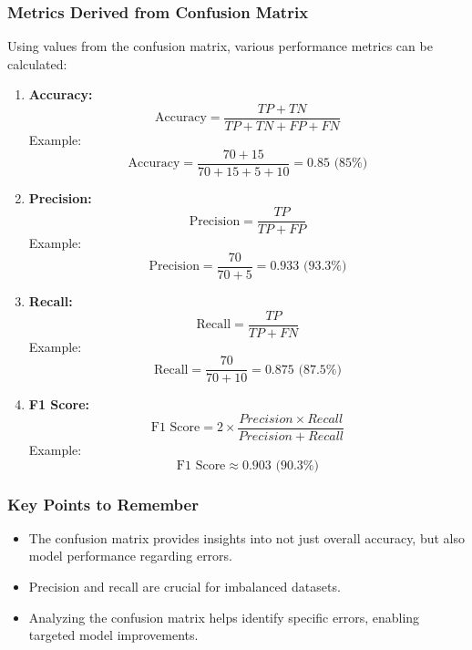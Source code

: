 \documentclass[aspectratio=169]{beamer}
\begin{document}
\begin{frame}[fragile]
  \frametitle{Metrics Derived from Confusion Matrix}
  Using values from the confusion matrix, various performance metrics can be calculated:

  \begin{enumerate}
    \item \textbf{Accuracy:}
      \begin{equation}
      \text{Accuracy} = \frac{TP + TN}{TP + TN + FP + FN}
      \end{equation}
      Example: 
      \begin{equation}
      \text{Accuracy} = \frac{70 + 15}{70 + 15 + 5 + 10} = 0.85 \text{ (85\%)}
      \end{equation}
    
    \item \textbf{Precision:} 
      \begin{equation}
      \text{Precision} = \frac{TP}{TP + FP}
      \end{equation}
      Example: 
      \begin{equation}
      \text{Precision} = \frac{70}{70 + 5} = 0.933 \text{ (93.3\%)}
      \end{equation}
    
    \item \textbf{Recall:} 
      \begin{equation}
      \text{Recall} = \frac{TP}{TP + FN}
      \end{equation}
      Example:
      \begin{equation}
      \text{Recall} = \frac{70}{70 + 10} = 0.875 \text{ (87.5\%)}
      \end{equation}
    
    \item \textbf{F1 Score:}
      \begin{equation}
      \text{F1 Score} = 2 \times \frac{Precision \times Recall}{Precision + Recall}
      \end{equation}
      Example:
      \begin{equation}
      \text{F1 Score} \approx 0.903 \text{ (90.3\%)}
      \end{equation}
  \end{enumerate}
\end{frame}

\begin{frame}[fragile]
  \frametitle{Key Points to Remember}
  \begin{itemize}
    \item The confusion matrix provides insights into not just overall accuracy, but also model performance regarding errors.
    \item Precision and recall are crucial for imbalanced datasets.
    \item Analyzing the confusion matrix helps identify specific errors, enabling targeted model improvements.
  \end{itemize}
\end{frame}
\end{document}
